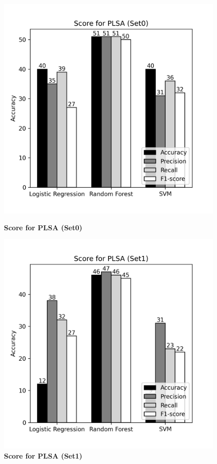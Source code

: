 \documentclass[12pt]{report}
\begin{document}
             \begin{figure}[!htb]
                \begin{minipage}{0.48\textwidth}
                  \centering
                  \includegraphics[scale=0.55]{plots/Score for PLSA (Set0).png}
                  \caption{\textbf{Score for PLSA (Set0)}}\label{Fig:typo1}
                \end{minipage}\hfill
                \begin{minipage}{0.48\textwidth}
                  \centering
                  \includegraphics[scale=0.55]{plots/Score for PLSA (Set1).png}
                  \caption{\textbf{Score for PLSA (Set1)}}\label{Fig:typo2}
                \end{minipage}
             \end{figure}
\end{document}
